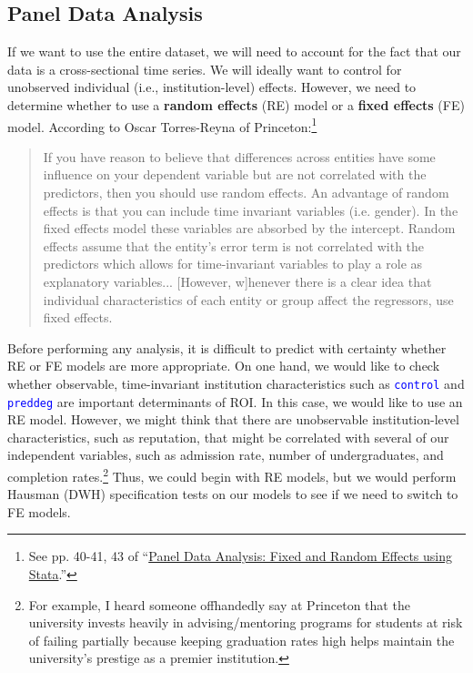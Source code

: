 \documentclass[12pt]{article}
\numberwithin{equation}{section}
\newcommand{\Varnm}[1]{\texttt{\textcolor{Blue}{#1}}}
\begin{document}
\subsection{Panel Data Analysis}

If we want to use the entire dataset, we will need to account for the fact that our data is a cross-sectional time series. We will ideally want to control for unobserved individual (i.e., institution-level) effects. However, we need to determine whether to use a \textbf{random effects} (RE) model or a \textbf{fixed effects} (FE) model. According to Oscar Torres-Reyna of Princeton:\footnote{See pp. 40-41, 43 of \enquote{\href{https://www.princeton.edu/~otorres/Panel101.pdf}{Panel Data Analysis: Fixed and Random Effects using Stata}.}}
\begin{quote}
If you have reason to believe that differences across entities have some influence on your dependent variable but are not correlated with the predictors, then you should use random effects. An advantage of random effects is that you can include time invariant variables (i.e. gender). In the fixed effects model these variables are absorbed by the intercept. Random effects assume that the entity's error term is not correlated with the predictors which allows for time-invariant variables to play a role as explanatory variables... [However, w]henever there is a clear idea that individual characteristics of each entity or group affect the regressors, use fixed effects.
\end{quote}
Before performing any analysis, it is difficult to predict with certainty whether RE or FE models are more appropriate. On one hand, we would like to check whether observable, time-invariant institution characteristics such as \Varnm{control} and \Varnm{preddeg} are important determinants of ROI. In this case, we would like to use an RE model. However, we might think that there are unobservable institution-level characteristics, such as reputation, that might be correlated with several of our independent variables, such as admission rate, number of undergraduates, and completion rates.\footnote{For example, I heard someone offhandedly say at Princeton that the university invests heavily in advising/mentoring programs for students at risk of failing partially because keeping graduation rates high helps maintain the university's prestige as a premier institution.} Thus, we could begin with RE models, but we would perform Hausman (DWH) specification tests on our models to see if we need to switch to FE models.
\end{document}
